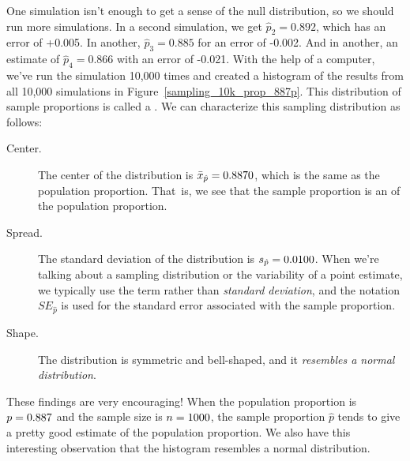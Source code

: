 One simulation isn't enough to get a sense of the null
distribution, so we should run more simulations. In a second
simulation, we get $\hat{p}_2 = 0.892$, which has an error of
+0.005.
In another, $\hat{p}_3 = 0.885$ for an error of -0.002. And in another,
an estimate of $\hat{p}_4 = 0.866$ with an error of -0.021.
With the help of a computer, we've run the simulation 10,000 times
and created a histogram of the results from all 10,000 simulations
in Figure~\ref{sampling_10k_prop_887p}. This
distribution of sample proportions is called a
.
We can characterize this sampling distribution as follows:
\begin{description}
\item[Center.] The center of the distribution is
    $\bar{x}_{\hat{p}} = 0.887{}0$, which is the same as the
    population proportion.
    That~is, we see that the sample proportion is an
     of the population proportion.
\item[Spread.] The standard deviation of the distribution
    is $s_{\hat{p}} = 0.0100{}$. When we're talking about
    a sampling distribution or the variability of
    a point estimate, we typically use the term
    rather than \emph{standard deviation},
    and the notation $SE_{\hat{p}}$ is used for the standard
    error associated with the sample proportion.
\item[Shape.] The distribution is symmetric and bell-shaped,
    and it \emph{resembles a normal distribution}.
\end{description}
These findings are very encouraging! When the population
proportion is $p = 0.887{}$ and the sample size is
$n = 1000{}$,
the sample proportion $\hat{p}$ tends to give a pretty good estimate
of the population proportion. We also have this interesting observation
that the histogram resembles a normal distribution.

